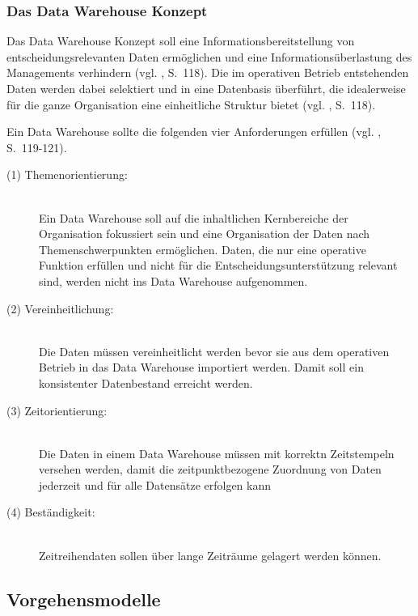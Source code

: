 \subsubsection{Das Data Warehouse Konzept}

Das Data Warehouse Konzept soll eine Informationsbereitstellung
von entscheidungsrelevanten Daten ermöglichen und
eine Informationsüberlastung des Managements verhindern (vgl. \cite{Gluchowski}, S.~118).
Die im operativen Betrieb entstehenden Daten werden dabei selektiert und in eine Datenbasis
überführt, die idealerweise für die ganze Organisation eine einheitliche Struktur bietet
(vgl. \cite{Gluchowski}, S.~118).

Ein Data Warehouse sollte die folgenden vier Anforderungen erfüllen (vgl. \cite{Gluchowski}, S.~119-121).

\begin{description}

\item[(1) Themenorientierung:] \hfill \\
Ein Data Warehouse soll auf die inhaltlichen Kernbereiche der Organisation fokussiert sein
und eine Organisation der Daten nach Themenschwerpunkten ermöglichen.
Daten, die nur eine operative Funktion erfüllen und nicht für die
Entscheidungsunterstützung relevant sind, werden nicht ins Data
Warehouse aufgenommen.

\item[(2) Vereinheitlichung:] \hfill \\
Die Daten müssen vereinheitlicht werden bevor sie aus dem operativen
Betrieb in das Data Warehouse importiert werden. Damit soll ein
konsistenter Datenbestand erreicht werden.

\item[(3) Zeitorientierung:] \hfill \\
Die Daten in einem Data Warehouse müssen mit korrektn Zeitstempeln versehen werden,
damit die zeitpunktbezogene Zuordnung von Daten jederzeit und für alle Datensätze erfolgen kann

\item[(4) Beständigkeit:] \hfill \\
Zeitreihendaten sollen über lange Zeiträume gelagert werden können.

\end{description}


\subsection{Vorgehensmodelle}

